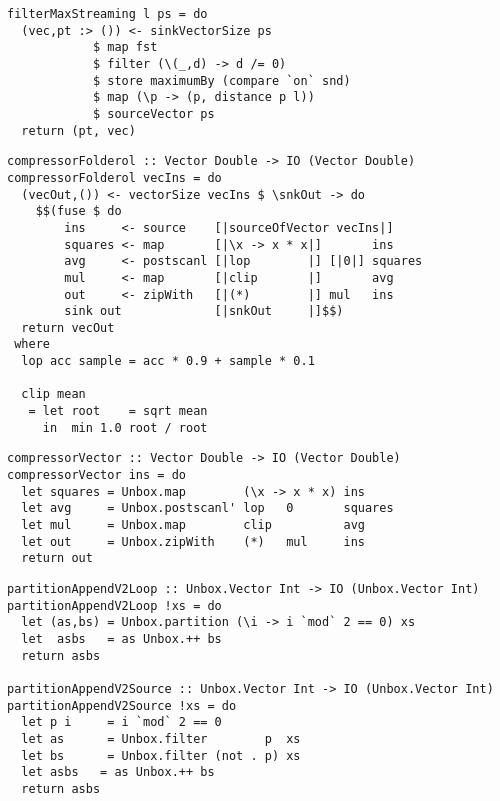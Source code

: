\begin{lstlisting}[float,label=l:a:bench:filterMaxStreaming,caption=Streaming implementation of filterMax]
filterMaxStreaming l ps = do
  (vec,pt :> ()) <- sinkVectorSize ps
            $ map fst
            $ filter (\(_,d) -> d /= 0)
            $ store maximumBy (compare `on` snd)
            $ map (\p -> (p, distance p l))
            $ sourceVector ps
  return (pt, vec)
\end{lstlisting}

\begin{lstlisting}[float,label=l:bench:compressorFolderol,caption=Folderol implementation of compressor]
compressorFolderol :: Vector Double -> IO (Vector Double)
compressorFolderol vecIns = do
  (vecOut,()) <- vectorSize vecIns $ \snkOut -> do
    $$(fuse $ do
        ins     <- source    [|sourceOfVector vecIns|]
        squares <- map       [|\x -> x * x|]       ins
        avg     <- postscanl [|lop        |] [|0|] squares
        mul     <- map       [|clip       |]       avg
        out     <- zipWith   [|(*)        |] mul   ins
        sink out             [|snkOut     |]$$)
  return vecOut
 where
  lop acc sample = acc * 0.9 + sample * 0.1

  clip mean
   = let root    = sqrt mean
     in  min 1.0 root / root
\end{lstlisting}


\begin{lstlisting}[float,label=l:bench:compressorVector,caption=Vector implementation of compressor]
compressorVector :: Vector Double -> IO (Vector Double)
compressorVector ins = do
  let squares = Unbox.map        (\x -> x * x) ins
  let avg     = Unbox.postscanl' lop   0       squares
  let mul     = Unbox.map        clip          avg
  let out     = Unbox.zipWith    (*)   mul     ins
  return out
\end{lstlisting}

\begin{lstlisting}[float,label=l:bench:partitionAppendVector,caption=Vector implementations of partitionAppend]
partitionAppendV2Loop :: Unbox.Vector Int -> IO (Unbox.Vector Int)
partitionAppendV2Loop !xs = do
  let (as,bs) = Unbox.partition (\i -> i `mod` 2 == 0) xs
  let  asbs   = as Unbox.++ bs
  return asbs

partitionAppendV2Source :: Unbox.Vector Int -> IO (Unbox.Vector Int)
partitionAppendV2Source !xs = do
  let p i     = i `mod` 2 == 0
  let as      = Unbox.filter        p  xs
  let bs      = Unbox.filter (not . p) xs
  let asbs   = as Unbox.++ bs
  return asbs
\end{lstlisting}
